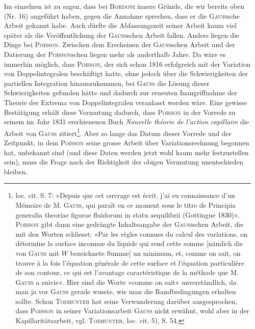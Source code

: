 Im einzelnen ist zu sagen, dass bei \textsc{Bordoni} innere Gründe, die wir bereits
oben (Nr. 16) angeführt haben, gegen die Annahme sprechen, dass er die
\textsc{Gauss}sche Arbeit gekannt habe. Auch dürfte die Abfassungszeit seiner Arbeit
\clearpage{}
\noindent kaum viel später als die Veröffentlichung der \textsc{Gauss}schen Arbeit fallen.
Anders liegen die Dinge bei \textsc{Poisson}. Zwischen dem Erscheinen der \textsc{Gauss}schen
Arbeit und der Datierung der \textsc{Poisson}schen liegen mehr als anderthalb
Jahre. Da wäre es immerhin möglich, dass \textsc{Poisson}, der sich schon 1816
erfolgreich mit der Variation von Doppelintegralen beschäftigt hatte, ohne
jedoch über die Schwierigkeiten der partiellen Integration hinauszukommen,
bei \textsc{Gauss} die Lösung dieser Schwierigkeiten gefunden hätte und dadurch zur
erneuten Inangriffnahme der Theorie der Extrema von Doppelintegralen veranlasst
worden wäre. Eine gewisse Bestätigung erhält diese Vermutung dadurch,
dass \textsc{Poisson} in der Vorrede zu seinem im Jahr 1831 erschienenen Buch
\textit{Nouvelle théorie de l’action capillaire} die Arbeit von \textsc{Gauss} zitiert\footnote{loc. cit. S. 7: »Depuis que cet ouvrage est écrit, j’ai eu connaissance d’un Mémoire de M. \textsc{Gauss},
qui paraît en ce moment sous le titre de Principia generalia theoriae figurae fluidorum in statu aequilibrii
(Gottingue 1830)«. \textsc{Poisson} gibt dann eine gedrängte Inhaltsangabe der \textsc{Gauss}schen Arbeit, die mit den
Worten schliesst: »Par les règles connues du calcul des variations, on détermine la surface inconnue du
liquide qui rend cette somme [nämlich die von \textsc{Gauss} mit $W$ bezeichnete Summe] un minimum, et, comme
on sait, on trouve à la fois l’équation générale de cette surface et l’équation particulière de son contour,
ce qui est l’avantage caractéristique de la méthode que M. \textsc{Gauss} a suivie«. Hier sind die Worte »comme
on sait« unverständlich, da man ja vor \textsc{Gauss} gerade  wusste, wie man die Randbedingungen erhalten
sollte. Schon \textsc{Todhunter} hat seine Verwunderung darüber ausgesprochen, dass \textsc{Poisson} in seiner Variationsarbeit
\textsc{Gauss} nicht erwähnt, wohl aber in der Kapillaritätsarbeit, vgl. \textsc{Todhunter}, loc. cit. 5), S. 54.}. Aber so
lange das Datum dieser Vorrede und der Zeitpunkt, in dem \textsc{Poisson} seine
grosse Arbeit über Variationsrechnung begonnen hat, unbekannt sind (und
diese Daten werden jetzt wohl kaum mehr festzustellen sein), muss die Frage
nach der Richtigkeit der obigen Vermutung unentschieden bleiben.

